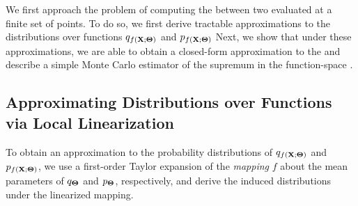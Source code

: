 We first approach the problem of computing the \kld between two \bnns evaluated at a finite set of points.
To do so, we first derive tractable approximations to the distributions over functions $q_{f(\mathbf X ; \boldsymbol{\Theta})}$ and $p_{f(\mathbf X ; \boldsymbol{\Theta})}$
Next, we show that under these approximations, we are able to obtain a closed-form approximation to the \kld and describe a simple Monte Carlo estimator of the supremum in the function-space \kld.


\subsection{Approximating Distributions over Functions via Local Linearization}
\label{subsec:linearizations}

To obtain an approximation to the probability distributions of $q_{f(\mathbf X ; \boldsymbol{\Theta})}$ and $p_{f(\mathbf X ; \boldsymbol{\Theta})}$, we use a first-order Taylor expansion of the \emph{mapping} $f$ about the mean parameters of $q_{\boldsymbol{\Theta}}$ and $p_{\boldsymbol{\Theta}}$, respectively, and derive the induced distributions under the linearized mapping.

